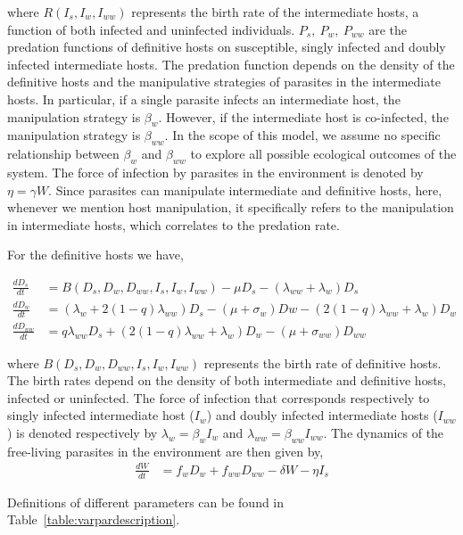 \documentclass[11pt]{article}
\begin{document}
where $R(I_s, I_w, I_{ww})$ represents the birth rate of the intermediate hosts, a function of both infected and uninfected individuals.
$P_s, \ P_w, \ P_{ww}$ are the predation functions of definitive hosts on susceptible, singly infected and doubly infected intermediate hosts. 
The predation function depends on the density of the definitive hosts and the manipulative strategies of parasites in the intermediate hosts. 
In particular, if a single parasite infects an intermediate host, the manipulation strategy is $\beta_w$. 
However, if the intermediate host is co-infected, the manipulation strategy is $\beta_{ww}$. 
In the scope of this model, we assume no specific relationship between $\beta_w$ and $\beta_{ww}$ to explore all possible ecological outcomes of the system. 
The force of infection by parasites in the environment is denoted by $\eta = \gamma W$. 
Since parasites can manipulate intermediate and definitive hosts, here, whenever we mention host manipulation, it specifically refers to the manipulation in intermediate hosts, which correlates to the predation rate.

For the definitive hosts we have,

\begin{align}
\frac{dD_s}{dt} &= B(D_s,  D_w,  D_{ww},  I_s, I_w, I_{ww})  - \mu D_s - (\lambda_{ww} + \lambda_w) D_s \nonumber \\    
\frac{dD_w}{dt} &= (\lambda_w + 2 (1 - q) \lambda_{ww}) D_s - (\mu + \sigma_w) Dw - (2 (1 - q) \lambda_{ww} + \lambda_w) D_w  \label{odes:dhosts} \\         
\frac{dD_{ww}}{dt} &= q \lambda_{ww} D_s + (2 (1 - q) \lambda_{ww} + \lambda_w) D_w - (\mu + \sigma_{ww}) D_{ww} \nonumber
\end{align}

where $B(D_s, D_w, D_{ww}, I_s, I_w, I_{ww})$ represents the birth rate of definitive hosts.
The birth rates depend on the density of both intermediate and definitive hosts, infected or uninfected. The force of infection that corresponds respectively to singly infected intermediate host ($I_w$) and doubly infected intermediate hosts ($I_{ww}$) is denoted respectively by $\lambda_w = \beta_w I_w$ and $\lambda_{ww} = \beta_{ww} I_{ww}$. 
The dynamics of the free-living parasites in the environment are then given by,
\begin{align}
	\frac{dW}{dt} &= f_w D_w + f_{ww} D_{ww} - \delta W - \eta I_s \label{odes:eparasite}
\end{align}

Definitions of different parameters can be found in Table~\ref{table:varpardescription}.
\end{document}
